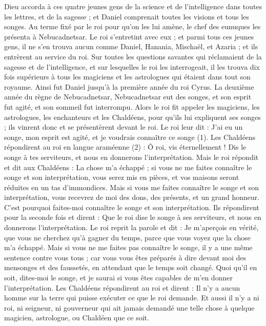 \begin{multicols}{2}
Dieu accorda à ces quatre jeunes gens de la science et de l'intelligence dans toutes les lettres, et de la sagesse ; et Daniel comprenait toutes les visions et tous les songes.
Au terme fixé par le roi pour qu’on les lui amène, le chef des eunuques les présenta à Nebucadnetsar.
Le roi s'entretint avec eux ; et parmi tous ces jeunes gens, il ne s'en trouva aucun comme Daniel, Hanania, Mischaël, et Azaria ; et ils entrèrent au service du roi.
Sur toutes les questions savantes qui réclamaient de la sagesse et de l’intelligence, et sur lesquelles le roi les interrogeait, il les trouva dix fois supérieurs à tous les magiciens et les astrologues qui étaient dans tout son royaume.
Ainsi fut Daniel jusqu'à la première année du roi Cyrus.
\VerseOne{}La deuxième année du règne de Nebucadnetsar, Nebucadnetsar eut des songes, et son esprit fut agité, et son sommeil fut interrompu.
Alors le roi fit appeler les magiciens, les astrologues, les enchanteurs et les Chaldéens, pour qu’ils lui expliquent ses songes ; ils vinrent donc et se présentèrent devant le roi.
Le roi leur dit : J'ai eu un songe, mon esprit est agité, et je voudrais connaître ce songe (1).
Les Chaldéens répondirent au roi en langue araméenne (2) : Ô roi, vis éternellement ! Dis le songe à tes serviteurs, et nous en donnerons l'interprétation.
Mais le roi répondit et dit aux Chaldéens : La chose m’a échappé ; si vous ne me faites connaître le songe et son interprétation, vous serez mis en pièces, et vos maisons seront réduites en un tas d’immondices.
Mais si vous me faites connaître le songe et son interprétation, vous recevrez de moi des dons, des présents, et un grand honneur. C’est pourquoi faites-moi connaître le songe et son interprétation.
Ils répondirent pour la seconde fois et dirent : Que le roi dise le songe à ses serviteurs, et nous en donnerons l'interprétation.
Le roi reprit la parole et dit : Je m’aperçois en vérité, que vous ne cherchez qu'à gagner du temps, parce que vous voyez que la chose m’a échappé.
Mais si vous ne me faites pas connaître le songe, il y a une même sentence contre vous tous ; car vous vous êtes préparés à dire devant moi des mensonges et des faussetés, en attendant que le temps soit changé. Quoi qu'il en soit, dites-moi le songe, et je saurai si vous êtes capables de m’en donner l'interprétation.
Les Chaldéens répondirent au roi et dirent : Il n'y a aucun homme sur la terre qui puisse exécuter ce que le roi demande. Et aussi il n'y a ni roi, ni seigneur, ni gouverneur qui ait jamais demandé une telle chose à quelque magicien, astrologue, ou Chaldéen que ce soit.

\end{multicols}
